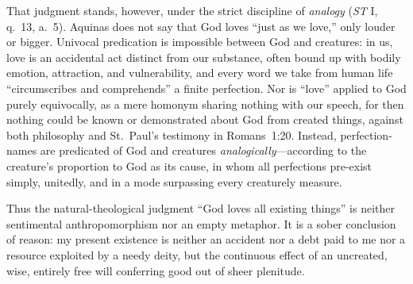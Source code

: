 That judgment stands, however, under the strict discipline of \emph{analogy} (\emph{ST} I, q.\ 13, a.\ 5). Aquinas does not say that God loves ``just as we love,'' only louder or bigger. Univocal predication is impossible between God and creatures: in us, love is an accidental act distinct from our substance, often bound up with bodily emotion, attraction, and vulnerability, and every word we take from human life ``circumscribes and comprehends'' a finite perfection. Nor is ``love'' applied to God purely equivocally, as a mere homonym sharing nothing with our speech, for then nothing could be known or demonstrated about God from created things, against both philosophy and St.\ Paul's testimony in Romans~1:20. Instead, perfection-names are predicated of God and creatures \emph{analogically}---according to the creature's proportion to God as its cause, in whom all perfections pre-exist simply, unitedly, and in a mode surpassing every creaturely measure.

Thus the natural-theological judgment ``God loves all existing things'' is neither sentimental anthropomorphism nor an empty metaphor. It is a sober conclusion of reason: my present existence is neither an accident nor a debt paid to me nor a resource exploited by a needy deity, but the continuous effect of an uncreated, wise, entirely free will conferring good out of sheer plenitude.
